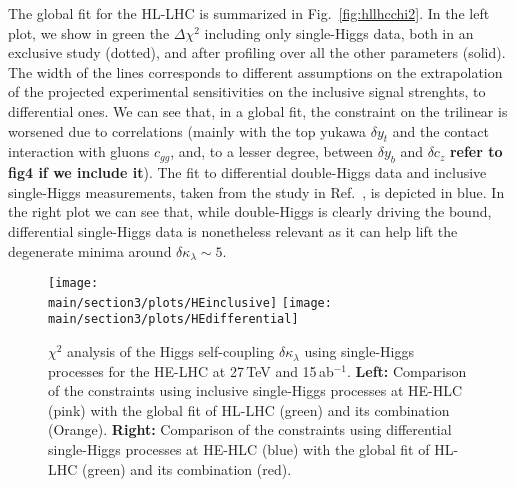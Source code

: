 The global fit for the HL-LHC is summarized in Fig.~\ref{fig:hllhcchi2}. In the left plot, we show in green the $\Delta\chi^2$ including only single-Higgs data, both in an exclusive study (dotted), and after profiling over all the other parameters (solid). The width of the lines corresponds to different assumptions on the extrapolation of the projected experimental sensitivities on the inclusive signal strenghts, to differential ones. We can see that, in a global fit, the constraint on the trilinear is worsened due to correlations (mainly with the top yukawa $\delta y_t$ and the contact interaction with gluons $c_{gg}$, and, to a lesser degree, between $\delta y_b$ and $\delta c_z$ \textbf{refer to fig4 if we include it}). The fit to differential double-Higgs data and inclusive single-Higgs measurements, taken from the study in Ref.~\cite{Azatov:2015oxa}, is depicted in blue. In the right plot we can see that, while double-Higgs is clearly driving the bound, differential single-Higgs data is nonetheless relevant as it can help lift the degenerate minima around $\delta \kappa_\lambda\sim 5$.
\medskip


\begin{figure}
	\centering
	\texttt{[image: \\main/section3/plots/HEinclusive]}\hfill
	\texttt{[image: \\main/section3/plots/HEdifferential]}
	\caption{$\chi^2$ analysis of the Higgs self-coupling $\delta \kappa_\lambda$ using single-Higgs processes for the HE-LHC at 27\,TeV and 15\,ab$^{-1}$. \textbf{Left:} Comparison of the constraints using inclusive single-Higgs processes at HE-HLC (pink) with the global fit of HL-LHC (green) and its combination (Orange). \textbf{Right:} Comparison of the constraints using differential single-Higgs processes at HE-HLC (blue) with the global fit of HL-LHC (green) and its combination (red).}
	\label{fig:helhcchi2}
\end{figure}	


